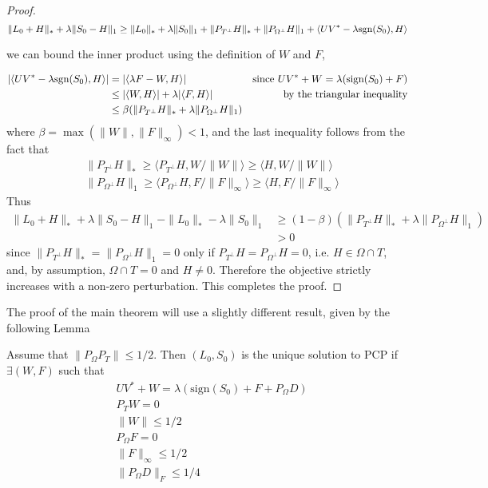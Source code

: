 \begin{proof}
\[
\|L_0 + H\|_* + \lambda \|S_0 - H\|_1 \geq \|L_0\|_* + \lambda \|S_0\|_1  + \|P_{T^\perp} H\|_* + \|P_{\Omega^\perp} H\|_1 + \langle UV^* - \lambda  \text{sgn}(S_0), H\rangle
\]

we can bound the inner product using the definition of $W$ and $F$,

\begin{align*}
|\langle UV^* - \lambda  \text{sgn}(S_0), H\rangle|
& = |\langle \lambda F - W, H\rangle|  & \text{since } UV^* + W = \lambda(\text{sign}(S_0) + F) \\
&\leq |\langle W, H \rangle| + \lambda |\langle F, H \rangle| & \text{by the triangular inequality} \\
&\leq \beta (\|P_{T^\perp} H\|_* + \lambda \|P_{\Omega^\perp} H\|_1)
\end{align*}
where $\beta = \max (\|W\|, \|F\|_\infty) < 1$, and the last inequality follows from the fact that
\[
\begin{aligned}
& \|P_{T^\perp} H\|_* \geq \langle P_{T^\perp} H, W/\|W\| \rangle \geq \langle H, W/\|W\| \rangle\\
& \|P_{\Omega^\perp} H\|_1 \geq \langle P_{\Omega^\perp} H, F/\|F\|_\infty \rangle \geq \langle H, F/\|F\|_\infty \rangle
\end{aligned}
\]
Thus
\begin{align*}
\|L_0 + H\|_* + \lambda \|S_0 - H\|_1 - \|L_0\|_* - \lambda \|S_0 \|_1 
&\geq  (1-\beta) \left( \|P_{T^\perp} H\|_* + \lambda \|P_{\Omega^\perp} H\|_1 \right) \\
& > 0
\end{align*}
since $\|P_{T^\perp} H\|_* = \|P_{\Omega^\perp} H\|_1 = 0$ only if $P_{T^\perp} H = P_{\Omega^\perp} H = 0$, i.e. $H \in \Omega \cap T$, and, by assumption, $\Omega \cap T = {0}$ and $H \neq 0$. Therefore the objective strictly increases with a non-zero perturbation. This completes the proof.

\end{proof}


The proof of the main theorem will use a slightly different result, given by the following Lemma
\begin{lemma}
\label{lem:dual_cert}
Assume that $\|P_\Omega P_T \| \leq 1/2$. Then $(L_0,S_0)$ is the unique solution to PCP if $\exists (W, F)$ such that
\begin{equation}
\begin{aligned}
& UV^* + W = \lambda(\text{sign}(S_0) + F + P_\Omega D) \\
& P_T W = 0 \\
& \|W\| \leq 1/2 \\
& P_\Omega F = 0 \\
& \|F\|_\infty \leq 1/2 \\
&\|P_\Omega D \|_F \leq 1/4
\end{aligned}
\end{equation}

\end{lemma}

